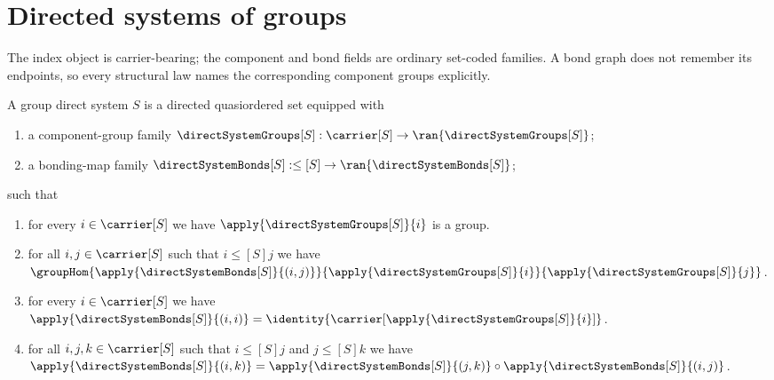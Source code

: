 


\section{Directed systems of groups}

The index object is carrier-bearing; the component and bond fields are
ordinary set-coded families.  A bond graph does not remember its endpoints,
so every structural law names the corresponding component groups explicitly.

\begin{struct}\label{group_direct_system}
    A group direct system $S$ is a directed quasiordered set equipped with
    \begin{enumerate}
        \item\label{group_direct_system_group_family}
            a component-group family
            $\directSystemGroups[S]:
                \carrier[S]\to\ran{\directSystemGroups[S]}$;
        \item\label{group_direct_system_bond_family}
            a bonding-map family
            $\directSystemBonds[S]:
                \leq[S]\to\ran{\directSystemBonds[S]}$;
    \end{enumerate}
    such that
    \begin{enumerate}
        \item\label{group_direct_system_component_group}
            for every $i\in\carrier[S]$ we have
                $\apply{\directSystemGroups[S]}{i}$ is a group.
        \item\label{group_direct_system_bond_hom}
            for all $i,j\in\carrier[S]$ such that
                $i\mathrel{\leq[S]}j$ we have
                $\groupHom
                    {\apply{\directSystemBonds[S]}{(i,j)}}
                    {\apply{\directSystemGroups[S]}{i}}
                    {\apply{\directSystemGroups[S]}{j}}$.
        \item\label{group_direct_system_identity}
            for every $i\in\carrier[S]$ we have
                $\apply{\directSystemBonds[S]}{(i,i)}
                    =\identity{\carrier[\apply{\directSystemGroups[S]}{i}]}$.
        \item\label{group_direct_system_composition}
            for all $i,j,k\in\carrier[S]$ such that
                $i\mathrel{\leq[S]}j$ and
                $j\mathrel{\leq[S]}k$ we have
                $\apply{\directSystemBonds[S]}{(i,k)}
                    =\apply{\directSystemBonds[S]}{(j,k)}
                        \circ
                     \apply{\directSystemBonds[S]}{(i,j)}$.
    \end{enumerate}
\end{struct}

